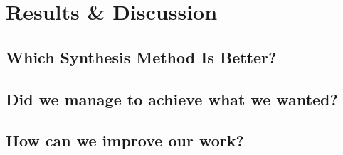 \chapter{Results \& Discussion}\label{ch:results}


\section{Which Synthesis Method Is Better?}

\section{Did we manage to achieve what we wanted?}

\section{How can we improve our work?}